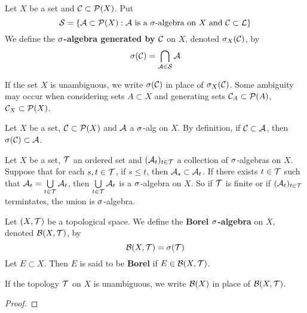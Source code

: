 \documentclass{book}
\begin{document}
	\begin{defn}  
		Let $X$ be a set and $\mathcal{C} \subset \mathcal{P}(X)$. Put $$\mathcal{S} = \{\mathcal{A} \subset \mathcal{P}(X): \mathcal{A} \text{ is a }\sigma\text{-algebra on }X \text{ and } \mathcal{C} \subset \mathcal{L}\}$$ We define the \textbf{$\sigma$-algebra generated by $\mathcal{C}$} on $X$, denoted $\sigma_X(\mathcal{C})$, by $$\sigma(\mathcal{C}) = \bigcap_{\mathcal{A} \in \mathcal{S}} \mathcal{A} $$
	\end{defn}

	\begin{note}
		If the set $X$ is unambiguous, we write $\sigma(\mathcal{C})$ in place of $\sigma_X(\mathcal{C})$. Some ambiguity may occur when considering sets $A \subset X$ and generating sets $\mathcal{C}_A \subset \mathcal{P}(A)$, $\mathcal{C}_X \subset \mathcal{P}(X)$. 
	\end{note}
	
	\begin{note}
		Let $X$ be a set, $\mathcal{C} \subset \mathcal{P}(X)$ and $\mathcal{A}$ a $\sigma$-alg on $X$. By definition, if $\mathcal{C} \subset \mathcal{A}$, then $\sigma(\mathcal{C}) \subset \mathcal{A}$.
	\end{note}
	
	\begin{note}
		Let $X$ be a set, $\mathcal{T}$ an ordered set and $(\mathcal{A}_t)_{t\in \mathcal{T}}$ a collection of $\sigma$-algebras on $X$. Suppose that for each $s,t \in \mathcal{T}$, if $s \leq t$, then $\mathcal{A}_s \subset \mathcal{A}_t$. If there exists $t \in \mathcal{T}$ such that $\mathcal{A}_t = \bigcup\limits_{t \in \mathcal{T}}\mathcal{A}_t$, then $\bigcup\limits_{t \in \mathcal{T}}\mathcal{A}_t$ is a $\sigma$-algebra on $X$. So if $\mathcal{T}$ is finite or if $(\mathcal{A}_t)_{t \in \mathcal{T}}$ termintates, the union is $\sigma$-algebra.
	\end{note}
	
	\begin{defn}  
		Let $(X,\mathcal{T})$ be a topological space. We define the \textbf{Borel $\sigma$-algebra} on $X$, denoted $\mathcal{B}(X, \mathcal{T})$, by 
		$$\mathcal{B}(X, \mathcal{T}) = \sigma(\mathcal{T})$$  
		Let $E \subset X$. Then $E$ is said to be \textbf{Borel} if $E \in \mathcal{B}(X, \mathcal{T})$.
	\end{defn}

	\begin{note}
		If the topology $\mathcal{T}$ on $X$ is unambiguous, we write $\mathcal{B}(X)$ in place of $\mathcal{B}(X, \mathcal{T})$.
	\end{note}

	\begin{ex}
		\tcr{Show that $\MB(\ol{\R}) = \sig((\al, \infty]: \al \in \R)$ and similar}
	\end{ex}

	\begin{proof}
	\end{proof}
	
\end{document}
